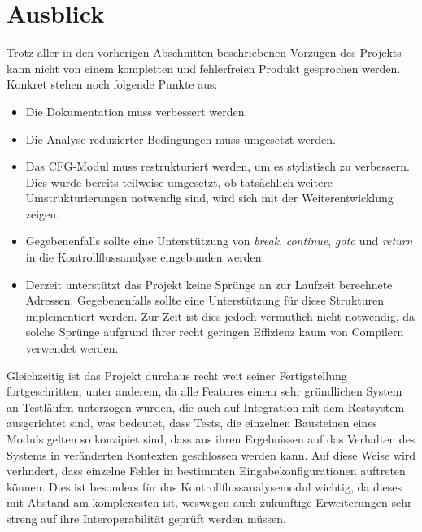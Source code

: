 \documentclass[11pt]{article} %
\begin{document}
\section{Ausblick}
Trotz aller in den vorherigen Abschnitten beschriebenen Vorzügen des Projekts kann nicht von
einem kompletten und fehlerfreien Produkt gesprochen werden. Konkret stehen noch folgende Punkte aus:
\begin{itemize}
	\item{Die Dokumentation muss verbessert werden.}
	\item{Die Analyse reduzierter Bedingungen muss umgesetzt werden.}
	\item{Das CFG-Modul muss restrukturiert werden, um es stylistisch zu verbessern. Dies wurde
		bereits teilweise umgesetzt, ob tatsächlich weitere Umstrukturierungen notwendig sind,
		wird sich mit der Weiterentwicklung zeigen.}
	\item{Gegebenenfalls sollte eine Unterstützung von \textit{break}, \textit{continue},
		\textit{goto} und \textit{return} in die Kontrollflussanalyse eingebunden werden.}
	\item{Derzeit unterstützt das Projekt keine Sprünge an zur Laufzeit berechnete Adressen. Gegebenenfalls
		sollte eine Unterstützung für diese Strukturen implementiert werden. Zur Zeit ist dies
		jedoch vermutlich nicht notwendig, da solche Sprünge aufgrund ihrer recht geringen Effizienz
		kaum von Compilern verwendet werden.}
\end{itemize}
Gleichzeitig ist das Projekt durchaus recht weit seiner Fertigstellung fortgeschritten, unter
anderem, da alle Features einem sehr gründlichen System an Testläufen unterzogen wurden, die auch
auf Integration mit dem Restsystem ausgerichtet sind, was bedeutet, dass Tests, die einzelnen
Bausteinen eines Moduls gelten so konzipiet sind, dass aus ihren Ergebnissen auf das Verhalten des
Systems in veränderten Kontexten geschlossen werden kann. Auf diese Weise wird verhndert, dass
einzelne Fehler in bestimmten Eingabekonfigurationen auftreten können. Dies ist besonders für das
Kontrollflussanalysemodul wichtig, da dieses mit Abstand am komplexesten ist, weswegen auch
zukünftige Erweiterungen sehr streng auf ihre Interoperabilität geprüft werden müssen.



\end{document}
